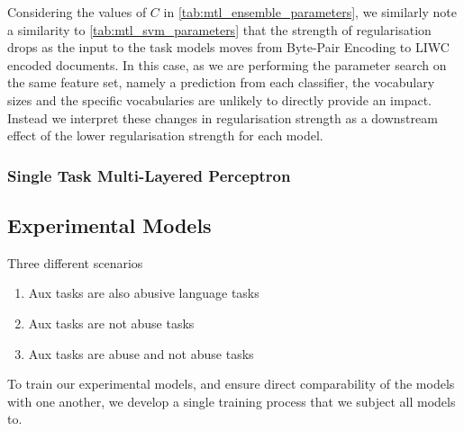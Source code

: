 Considering the values of $C$ in \autoref{tab:mtl_ensemble_parameters}, we similarly note a similarity to \autoref{tab:mtl_svm_parameters} that the strength of regularisation drops as the input to the task models moves from Byte-Pair Encoding to LIWC encoded documents. In this case, as we are performing the parameter search on the same feature set, namely a prediction from each classifier, the vocabulary sizes and the specific vocabularies are unlikely to directly provide an impact. Instead we interpret these changes in regularisation strength as a downstream effect of the lower regularisation strength for each model.

\subsubsection{Single Task Multi-Layered Perceptron}


\subsection{Experimental Models}

Three different scenarios
\begin{enumerate}
  \item Aux tasks are also abusive language tasks
  \item Aux tasks are not abuse tasks
  \item Aux tasks are abuse and not abuse tasks
\end{enumerate}

To train our experimental models, and ensure direct comparability of the models with one another, we develop a single training process that we subject all models to.\vspace{5mm}

